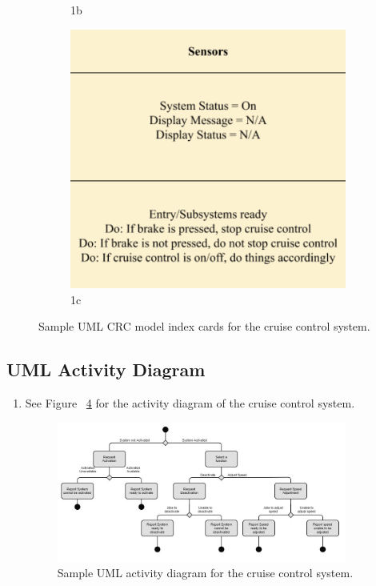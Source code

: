 \documentclass[preprint,11pt,3p]{article}
\begin{document}
\begin{enumerate}
\begin{figure}[H]
\begin{subfigure}{.3\textwidth}
				\caption{1b}
				\label{fig:sub2}
			\end{subfigure}
			\begin{subfigure}{.3\textwidth}
				\centering
				\includegraphics[width=.8\linewidth]{images/indexUML3}
				\caption{1c}
				\label{fig:sub3}
			\end{subfigure}
			\caption{Sample UML CRC model index cards for the cruise control system.}
			\label{fig:indexUML}
		\end{figure}
\end{enumerate}

\subsection{UML Activity Diagram}
\begin{enumerate}
	\item See Figure ~\ref{fig:activityUML} for the activity diagram of the cruise control system.
		\begin{figure}[H]
			\includegraphics[width=0.9\textwidth]{images/activityUML.jpg}
			\caption{Sample UML activity diagram for the cruise control system.}
			\label{fig:activityUML}
		\end{figure} 
\end{enumerate}
\end{document}
